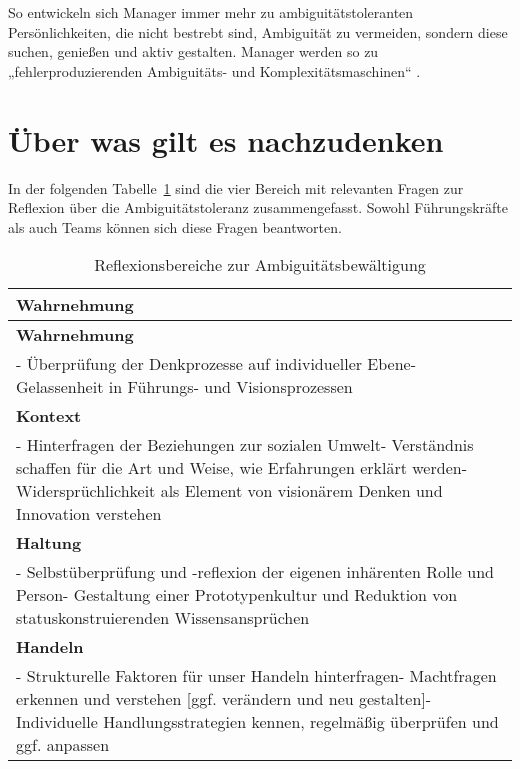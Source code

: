 \documentclass[
  ngerman,
  letterpaper,
  DIV=11]{scrartcl}
\begin{document}
So entwickeln sich Manager immer mehr zu ambiguitätstoleranten
Persönlichkeiten, die nicht bestrebt sind, Ambiguität zu vermeiden,
sondern diese suchen, genießen und aktiv gestalten. Manager werden so zu
„fehlerproduzierenden Ambiguitäts- und Komplexitätsmaschinen``
\autocite{gutzmer2020}.

\section{Über was gilt es
nachzudenken}\label{uxfcber-was-gilt-es-nachzudenken}

In der folgenden Tabelle~\ref{tbl-ref} sind die vier Bereich mit
relevanten Fragen zur Reflexion über die Ambiguitätstoleranz
zusammengefasst. Sowohl Führungskräfte als auch Teams können sich diese
Fragen beantworten.

\begin{longtable}[]{@{}
  >{\raggedright\arraybackslash}p{}@{}}
\caption{Reflexionsbereiche zur
Ambiguitätsbewältigung}\label{tbl-ref}\tabularnewline
\toprule\noalign{}
\begin{minipage}[b]{\linewidth}\raggedright
\textbf{Wahrnehmung}
\end{minipage} \\
\midrule\noalign{}
\endfirsthead
\toprule\noalign{}
\begin{minipage}[b]{\linewidth}\raggedright
\textbf{Wahrnehmung}
\end{minipage} \\
\midrule\noalign{}
\endhead
\bottomrule\noalign{}
\endlastfoot
- Überprüfung der Denkprozesse auf individueller Ebene- Gelassenheit in
Führungs- und Visionsprozessen \\
\textbf{Kontext} \\
- Hinterfragen der Beziehungen zur sozialen Umwelt- Verständnis schaffen
für die Art und Weise, wie Erfahrungen erklärt werden-
Widersprüchlichkeit als Element von visionärem Denken und Innovation
verstehen \\
\textbf{Haltung} \\
- Selbstüberprüfung und -reflexion der eigenen inhärenten Rolle und
Person- Gestaltung einer Prototypenkultur und Reduktion von
statuskonstruierenden Wissensansprüchen \\
\textbf{Handeln} \\
- Strukturelle Faktoren für unser Handeln hinterfragen- Machtfragen
erkennen und verstehen {[}ggf. verändern und neu gestalten{]}-
Individuelle Handlungsstrategien kennen, regelmäßig überprüfen und ggf.
anpassen \\
\end{longtable}
\end{document}
